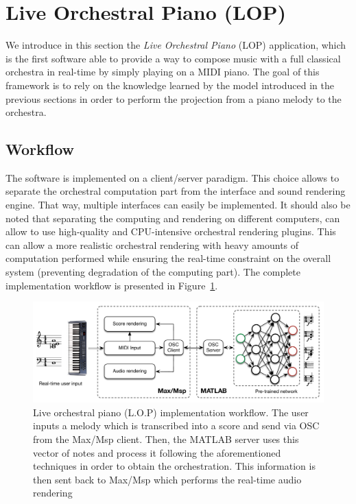 \documentclass[letterpaper]{article}
\begin{document}
\section{Live Orchestral Piano (LOP)}
We introduce in this section the \emph{Live Orchestral Piano} (LOP)
application, which is the first software able to provide a way to
compose music with a full classical orchestra in real-time by simply
playing on a MIDI piano. The goal of this framework is to rely on
the knowledge learned by the model introduced in the previous sections
in order to perform the projection from a piano melody to the orchestra.

\subsection{Workflow}
The software is implemented on a client/server paradigm. This choice
allows to separate the orchestral computation part from the interface
and sound rendering engine. That way, multiple interfaces can easily
be implemented. It should also be noted that separating the computing
and rendering on different computers, can allow to use high-quality
and CPU-intensive orchestral rendering plugins. This can allow a more
realistic orchestral rendering with heavy amounts of computation performed
while ensuring the real-time constraint on the overall system (preventing
degradation of the computing part). The complete implementation workflow
is presented in Figure~\ref{fig:Live-orchestral-piano}.

\begin{figure}
\begin{centering}
\includegraphics[scale=0.55]{workflow}
\par\end{centering}

\caption{\label{fig:Live-orchestral-piano}Live orchestral piano (L.O.P) implementation
workflow. The user inputs a melody which is transcribed into a score
and send via OSC from the Max/Msp client. Then, the MATLAB server
uses this vector of notes and process it following the aforementioned
techniques in order to obtain the orchestration. This information
is then sent back to Max/Msp which performs the real-time audio rendering }
\end{figure}
\end{document}
